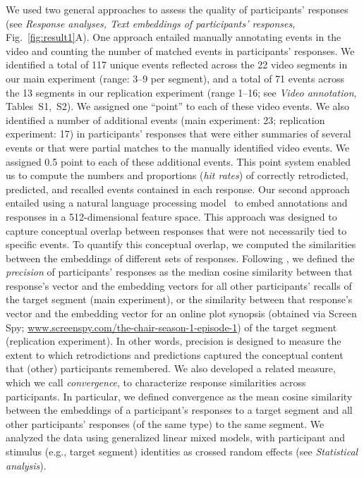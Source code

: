 \documentclass[10pt]{article}
\newcommand{\stimDescription}{S1}
\newcommand{\stimDescriptionRep}{S2}
\begin{document}
We used two general approaches to assess the quality of participants' responses (see \textit{Response analyses, Text embeddings of participants’ responses}, Fig.~\ref{fig:result1}A). One approach entailed manually annotating events in the video and counting the number of matched events in participants' responses. We identified a total of 117 unique events reflected across the 22 video segments in our main experiment (range: 3--9 per segment), and a total of 71 events across the 13 segments in our replication experiment (range 1--16; see \textit{Video annotation}, Tables~\stimDescription,~\stimDescriptionRep). We assigned one ``point'' to each of these video events. We also identified a number of additional events (main experiment: 23; replication experiment: 17) in participants' responses that were either summaries of several events or that were partial matches to the manually identified video events. We assigned 0.5 point to each of these additional events. This point system enabled us to compute the numbers and proportions (\textit{hit rates}) of correctly retrodicted, predicted, and recalled events contained in each response. Our second approach entailed using a natural language processing model~\citep{CerEtal18} to embed annotations and responses in a 512-dimensional feature space. This approach was designed to capture conceptual overlap between responses that were not necessarily tied to specific events. To quantify this conceptual overlap, we computed the similarities between the embeddings of different sets of responses. Following \cite{HeusEtal21}, we defined the \textit{precision} of participants' responses as the median cosine similarity between that response's vector and the embedding vectors for all other participants' recalls of the target segment (main experiment), or the similarity between that response's vector and the embedding vector for an online plot synopsis (obtained via Screen Spy; \url{www.screenspy.com/the-chair-season-1-episode-1}) of the target segment (replication experiment).  In other words, precision is designed to measure the extent to which retrodictions and predictions captured the conceptual content that (other) participants remembered. We also developed a related measure, which we call \textit{convergence}, to characterize response similarities across participants. In particular, we defined convergence as the mean cosine similarity between the embeddings of a participant's responses to a target segment and all other participants' responses (of the same type) to the same segment. We analyzed the data using generalized linear mixed models, with participant and stimulus (e.g., target segment) identities as crossed random effects (see \textit{Statistical analysis}).
\end{document}
